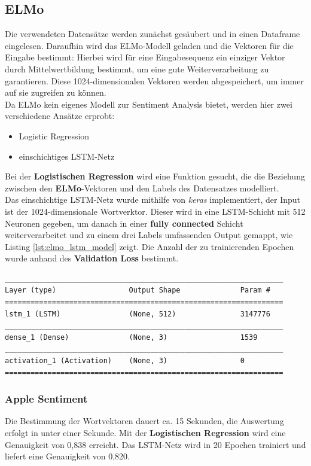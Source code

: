 \subsection{ELMo}
Die verwendeten Datens\"atze werden zun\"achst ges\"aubert und in einen Dataframe eingelesen. Daraufhin wird das ELMo-Modell geladen und die Vektoren f\"ur die Eingabe bestimmt: Hierbei wird f\"ur eine Eingabesequenz ein einziger Vektor durch Mittelwertbildung bestimmt, um eine gute Weiterverarbeitung zu garantieren. Diese 1024-dimensionalen Vektoren werden abgespeichert, um immer auf sie zugreifen zu k\"onnen.\\
Da ELMo kein eigenes Modell zur Sentiment Analysis bietet, werden hier zwei verschiedene Ans\"atze erprobt:
\begin{itemize}
\item Logistic Regression
\item einschichtiges LSTM-Netz
\end{itemize}
Bei der \textbf{Logistischen Regression} wird eine Funktion gesucht, die die Beziehung zwischen den \textbf{ELMo}-Vektoren und den Labels des Datensatzes modelliert.\\
Das einschichtige LSTM-Netz wurde mithilfe von \textit{keras} implementiert, der Input ist der 1024-dimensionale Wortverktor. Dieser wird in eine LSTM-Schicht mit 512 Neuronen gegeben, um danach in einer \textbf{fully connected} Schicht weiterverarbeitet und zu einem drei Labels umfassenden Output gemappt, wie Listing \ref{lst:elmo_lstm_model} zeigt. Die Anzahl der zu trainierenden Epochen wurde anhand des \textbf{Validation Loss} bestimmt.
\lstset{language=Python}
\lstset{frame=lines}
\lstset{captionpos=b}
\lstset{basicstyle=\footnotesize}
\begin{lstlisting}
_________________________________________________________________
Layer (type)                 Output Shape              Param #   
=================================================================
lstm_1 (LSTM)                (None, 512)               3147776   
_________________________________________________________________
dense_1 (Dense)              (None, 3)                 1539      
_________________________________________________________________
activation_1 (Activation)    (None, 3)                 0         
=================================================================
\end{lstlisting}

\subsubsection*{Apple Sentiment}
Die Bestimmung der Wortvektoren dauert ca. 15 Sekunden, die Auswertung erfolgt in unter einer Sekunde. Mit der \textbf{Logistischen Regression} wird eine Genauigkeit von 0,838 erreicht. Das LSTM-Netz wird in 20 Epochen trainiert und liefert eine Genauigkeit von 0,820.

